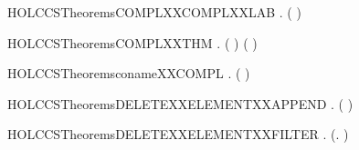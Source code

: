 \newcommand{\HOLCCSTheoremsCOMPLXXCOMPLXXACT}{\UseVerbatim{HOLCCSTheoremsCOMPLXXCOMPLXXACT}}
\begin{SaveVerbatim}{HOLCCSTheoremsCOMPLXXCOMPLXXLAB}
\HOLTokenTurnstile{} \HOLSymConst{\HOLTokenForall{}}.  ( ) \HOLSymConst{=} 
\end{SaveVerbatim}
\newcommand{\HOLCCSTheoremsCOMPLXXCOMPLXXLAB}{\UseVerbatim{HOLCCSTheoremsCOMPLXXCOMPLXXLAB}}
\begin{SaveVerbatim}{HOLCCSTheoremsCOMPLXXTHM}
\HOLTokenTurnstile{} \HOLSymConst{\HOLTokenForall{}} .
       ( \HOLSymConst{\HOLTokenNotEqual{}}   \HOLSymConst{\HOLTokenImp{}}   \HOLSymConst{\HOLTokenNotEqual{}}  ) \HOLSymConst{\HOLTokenConj{}}
       ( \HOLSymConst{\HOLTokenNotEqual{}}   \HOLSymConst{\HOLTokenImp{}}   \HOLSymConst{\HOLTokenNotEqual{}}  )
\end{SaveVerbatim}
\newcommand{\HOLCCSTheoremsCOMPLXXTHM}{\UseVerbatim{HOLCCSTheoremsCOMPLXXTHM}}
\begin{SaveVerbatim}{HOLCCSTheoremsconameXXCOMPL}
\HOLTokenTurnstile{} \HOLSymConst{\HOLTokenForall{}}.   \HOLSymConst{=}  ( )
\end{SaveVerbatim}
\newcommand{\HOLCCSTheoremsconameXXCOMPL}{\UseVerbatim{HOLCCSTheoremsconameXXCOMPL}}
\begin{SaveVerbatim}{HOLCCSTheoremsDELETEXXELEMENTXXAPPEND}
\HOLTokenTurnstile{} \HOLSymConst{\HOLTokenForall{}}  .
         ( \HOLSymConst{++} ) \HOLSymConst{=}
          \HOLSymConst{++}   
\end{SaveVerbatim}
\newcommand{\HOLCCSTheoremsDELETEXXELEMENTXXAPPEND}{\UseVerbatim{HOLCCSTheoremsDELETEXXELEMENTXXAPPEND}}
\begin{SaveVerbatim}{HOLCCSTheoremsDELETEXXELEMENTXXFILTER}
\HOLTokenTurnstile{} \HOLSymConst{\HOLTokenForall{}} .    \HOLSymConst{=}  (\HOLTokenLambda{}.  \HOLSymConst{\HOLTokenNotEqual{}} ) 
\end{SaveVerbatim}
